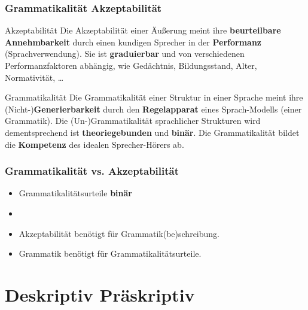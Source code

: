 \begin{frame}
\frametitle{Grammatikalität \vs Akzeptabilität}

\begin{block}{Akzeptabilität}
Die Akzeptabilität einer Äußerung meint ihre \textbf{beurteilbare Annehmbarkeit} durch einen kundigen Sprecher in der \textbf{Performanz} (Sprachverwendung). Sie ist \textbf{graduierbar} und von verschiedenen Performanzfaktoren abhängig, wie \zB Gedächtnis, Bildungsstand, Alter, Normativität, \dots 
\end{block}

\begin{block}{Grammatikalität}
Die Grammatikalität einer Struktur in einer Sprache meint ihre (Nicht-)\textbf{Generierbarkeit} durch den \textbf{Regelapparat} eines Sprach-Modells (einer Grammatik). Die (Un-)Grammatikalität sprachlicher Strukturen wird dementsprechend ist \textbf{theoriegebunden} und \idR \textbf{binär}. 
Die Grammatikalität bildet die \textbf{Kompetenz} des idealen Sprecher-Hörers ab.
\end{block}

\end{frame}


\begin{frame}
\frametitle{Grammatikalität vs. Akzeptabilität}

\begin{itemize}

	\item Grammatikalitätsurteile \ras \textbf{binär}
		
	\z
	
	\z
	
	\item[]
	
	\item Akzeptabilität benötigt für Grammatik(be)schreibung.

	\item Grammatik benötigt für Grammatikalitätsurteile. 

\end{itemize}

\end{frame}


\section{Deskriptiv \vs Präskriptiv}


